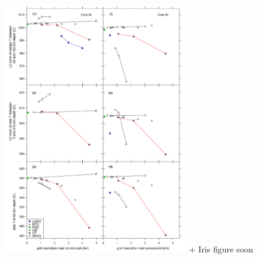 \begin{landscape}
\includegraphics[width=8cm]{python_codes/fieldstone_68/images/fig5}
 + Iris figure soon
\end{landscape}





